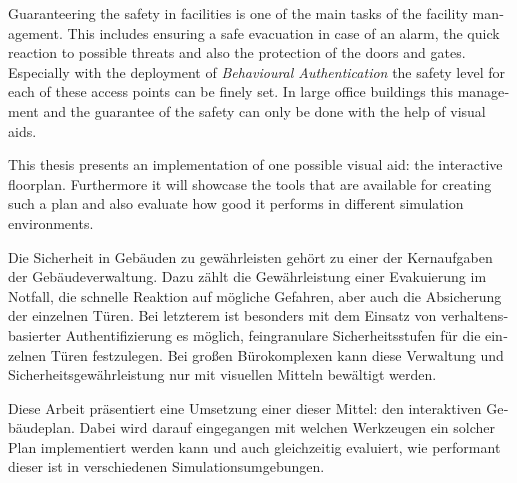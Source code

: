 
\null\vfil
\begin{otherlanguage}{english}
\begin{center}\textsf{\textbf{\abstractname}}\end{center}

\noindent Guaranteering the safety in facilities is one of the main tasks of the facility management. This includes ensuring a safe evacuation in case of an alarm, the quick reaction to possible threats and also the protection of the doors and gates. Especially with the deployment of \emph{Behavioural Authentication} the safety level for each of these access points can be finely set. In large office buildings this management and the guarantee of the safety can only be done with the help of visual aids.

This thesis presents an implementation of one possible visual aid: the interactive floorplan. Furthermore it will showcase the tools that are available for creating such a plan and also evaluate how good it performs in different simulation environments.

\end{otherlanguage}
\vfil\null



\null\vfil
\begin{otherlanguage}{ngerman}
\begin{center}\textsf{\textbf{\abstractname}}\end{center}

\noindent Die Sicherheit in Gebäuden zu gewährleisten gehört zu einer der Kernaufgaben der Gebäudeverwaltung. Dazu zählt die Gewährleistung einer Evakuierung im Notfall, die schnelle Reaktion auf mögliche Gefahren, aber auch die Absicherung der einzelnen Türen. Bei letzterem ist besonders mit dem Einsatz von verhaltensbasierter Authentifizierung es möglich, feingranulare Sicherheitsstufen für die einzelnen Türen festzulegen. Bei großen Bürokomplexen kann diese Verwaltung und Sicherheitsgewährleistung nur mit visuellen Mitteln bewältigt werden. 

Diese Arbeit präsentiert eine Umsetzung einer dieser Mittel: den interaktiven Gebäudeplan. Dabei wird darauf eingegangen mit welchen Werkzeugen ein solcher Plan implementiert werden kann und auch gleichzeitig evaluiert, wie performant dieser ist in  verschiedenen Simulationsumgebungen.

\end{otherlanguage}
\vfil\null



